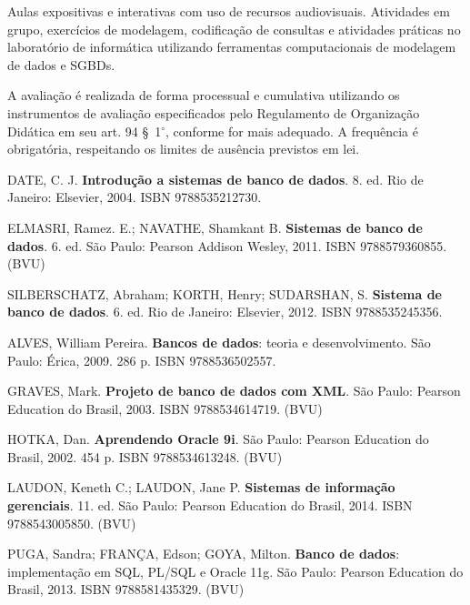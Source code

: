 \begin{pud}
	
	\metodologia
	Aulas expositivas e interativas com uso de recursos audiovisuais. Atividades em grupo, exercícios de modelagem, codificação de consultas e atividades práticas no laboratório de informática utilizando ferramentas computacionais de modelagem de dados e SGBDs.


	\avaliacao
	A avaliação é realizada de forma processual e cumulativa utilizando os instrumentos de avaliação especificados pelo Regulamento de Organização Didática em seu art. 94 \S~1$^\circ$, conforme for mais adequado. A frequência é obrigatória, respeitando os limites de ausência previstos em lei.
	

	\begin{bibbasica}
			
        \item DATE, C. J. \textbf{Introdução a sistemas de banco de dados}. 8. ed. Rio de Janeiro: Elsevier, 2004. ISBN 9788535212730. 
		\item ELMASRI, Ramez. E.; NAVATHE, Shamkant B. \textbf{Sistemas de banco de dados}. 6. ed. São Paulo: Pearson Addison Wesley, 2011. ISBN 9788579360855. (BVU)
		\item SILBERSCHATZ, Abraham; KORTH, Henry; SUDARSHAN, S. \textbf{Sistema de banco de dados}. 6. ed. Rio de Janeiro: Elsevier, 2012. ISBN 9788535245356. 
		
	\end{bibbasica}
	
	\begin{bibcomplementar}
    
	    \item ALVES, William Pereira. \textbf{Bancos de dados}: teoria e desenvolvimento. São Paulo: Érica, 2009. 286 p. ISBN 9788536502557.
		\item GRAVES, Mark. \textbf{Projeto de banco de dados com XML}. São Paulo: Pearson Education do Brasil, 2003.  ISBN 9788534614719. (BVU)
		\item HOTKA, Dan. \textbf{Aprendendo Oracle 9i}. São Paulo: Pearson Education do Brasil, 2002. 454 p. ISBN 9788534613248. (BVU)
		\item LAUDON, Keneth C.; LAUDON, Jane P. \textbf{Sistemas de informação gerenciais}. 11. ed. São Paulo: Pearson Education do Brasil, 2014.  ISBN 9788543005850. (BVU)
		\item PUGA, Sandra; FRANÇA, Edson; GOYA, Milton. \textbf{Banco de dados}: implementação em SQL, PL/SQL e Oracle 11g. São Paulo: Pearson Education do Brasil, 2013. ISBN 9788581435329. (BVU)
		 
	\end{bibcomplementar}
		
\end{pud}

